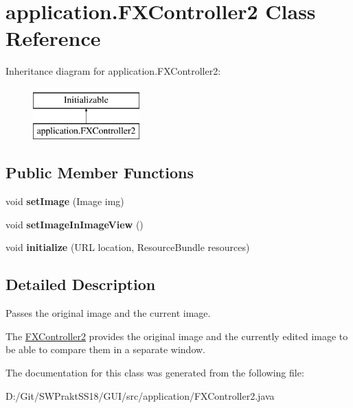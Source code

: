 \hypertarget{classapplication_1_1_f_x_controller2}{}\section{application.\+F\+X\+Controller2 Class Reference}
\label{classapplication_1_1_f_x_controller2}
Inheritance diagram for application.\+F\+X\+Controller2\+:\begin{figure}[H]
\begin{center}
\leavevmode
\includegraphics[height=2.000000cm]{classapplication_1_1_f_x_controller2}
\end{center}
\end{figure}
\subsection*{Public Member Functions}
\begin{DoxyCompactItemize}
\item 
\mbox{\label{classapplication_1_1_f_x_controller2_aabd0ecbee219d6d3a79147a5d1b3fd06}} 
void {\bfseries set\+Image} (Image img)
\item 
\mbox{\label{classapplication_1_1_f_x_controller2_a889afcc4017257a1e172adb2ce87350a}} 
void {\bfseries set\+Image\+In\+Image\+View} ()
\item 
\mbox{\label{classapplication_1_1_f_x_controller2_aa4a46ed76cd926e4d37fdd3e4fe8092e}} 
void {\bfseries initialize} (U\+RL location, Resource\+Bundle resources)
\end{DoxyCompactItemize}


\subsection{Detailed Description}
Passes the original image and the current image.

The \mbox{\hyperlink{classapplication_1_1_f_x_controller2}{F\+X\+Controller2}} provides the original image and the currently edited image to be able to compare them in a separate window. 

The documentation for this class was generated from the following file\+:\begin{DoxyCompactItemize}
\item 
D\+:/\+Git/\+S\+W\+Prakt\+S\+S18/\+G\+U\+I/src/application/F\+X\+Controller2.\+java\end{DoxyCompactItemize}
